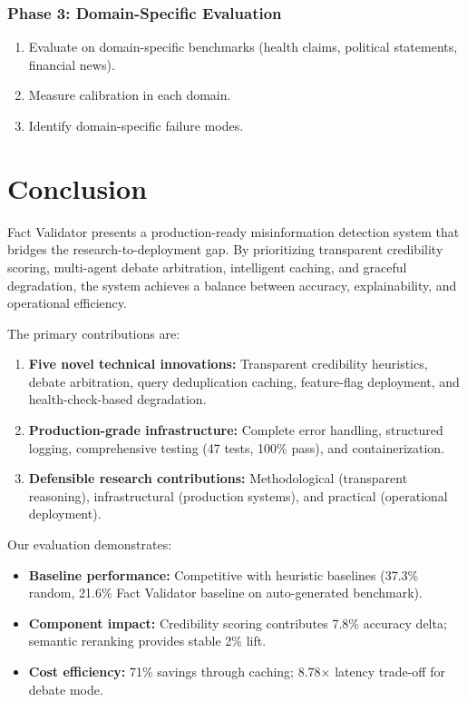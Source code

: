 \documentclass[12pt,a4paper,twoside]{article}
\begin{document}
\subsubsection{Phase 3: Domain-Specific Evaluation}

\begin{enumerate}
    \item Evaluate on domain-specific benchmarks (health claims, political statements, financial news).
    \item Measure calibration in each domain.
    \item Identify domain-specific failure modes.
\end{enumerate}

\section{Conclusion}

Fact Validator presents a production-ready misinformation detection system that bridges the research-to-deployment gap. By prioritizing transparent credibility scoring, multi-agent debate arbitration, intelligent caching, and graceful degradation, the system achieves a balance between accuracy, explainability, and operational efficiency.

The primary contributions are:

\begin{enumerate}
    \item \textbf{Five novel technical innovations:} Transparent credibility heuristics, debate arbitration, query deduplication caching, feature-flag deployment, and health-check-based degradation.
    
    \item \textbf{Production-grade infrastructure:} Complete error handling, structured logging, comprehensive testing (47 tests, 100\% pass), and containerization.
    
    \item \textbf{Defensible research contributions:} Methodological (transparent reasoning), infrastructural (production systems), and practical (operational deployment).
\end{enumerate}

Our evaluation demonstrates:

\begin{itemize}
    \item \textbf{Baseline performance:} Competitive with heuristic baselines (37.3\% random, 21.6\% Fact Validator baseline on auto-generated benchmark).
    \item \textbf{Component impact:} Credibility scoring contributes 7.8\% accuracy delta; semantic reranking provides stable 2\% lift.
    \item \textbf{Cost efficiency:} 71\% savings through caching; 8.78$\times$ latency trade-off for debate mode.
\end{itemize}
\end{document}
